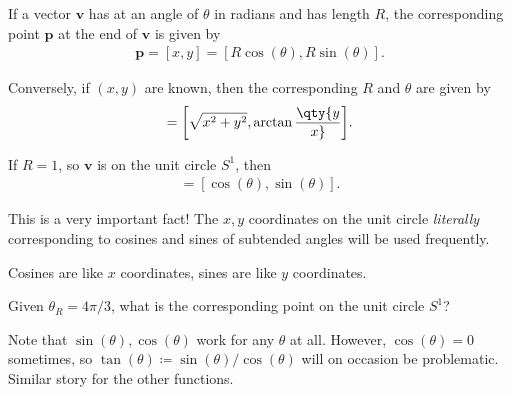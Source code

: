 \begin{theorem}

If a vector \(\mathbf{v}\) has at an angle of \(\theta\) in radians and
has length \(R\), the corresponding point \(\mathbf{p}\) at the end of
\(\mathbf{v}\) is given by
\begin{align*}
\mathbf{p} = {\left[ {x, y} \right]} = {\left[ {R\cos(\theta), R\sin(\theta)} \right]}
.\end{align*}

Conversely, if \((x, y)\) are known, then the corresponding \(R\) and
\(\theta\) are given by
\begin{align*}
[R, \theta] = {\left[ { \sqrt{x^2 + y^2}, \arctan\qty{y\over x} } \right]}
.\end{align*}

\end{theorem}

\begin{corollary}

If \(R=1\), so \(\mathbf{v}\) is on the unit circle \(S^1\), then
\begin{align*}
[x, y] = [\cos(\theta), \sin(\theta)]
.\end{align*}

\end{corollary}

\begin{remark}

This is a very important fact! The \(x, y\) coordinates on the unit
circle \emph{literally} corresponding to cosines and sines of subtended
angles will be used frequently.

\end{remark}

\begin{slogan}

Cosines are like \(x\) coordinates, sines are like \(y\) coordinates.

\end{slogan}

\begin{example}[?]

Given \(\theta_R = 4\pi/3\), what is the corresponding point on the unit
circle \(S^1\)?

\end{example}

\begin{warnings}

Note that \(\sin(\theta), \cos(\theta)\) work for any \(\theta\) at all.
However, \(\cos(\theta) = 0\) sometimes, so
\(\tan(\theta) \coloneqq\sin(\theta) / \cos(\theta)\) will on occasion
be problematic. Similar story for the other functions.

\end{warnings}

